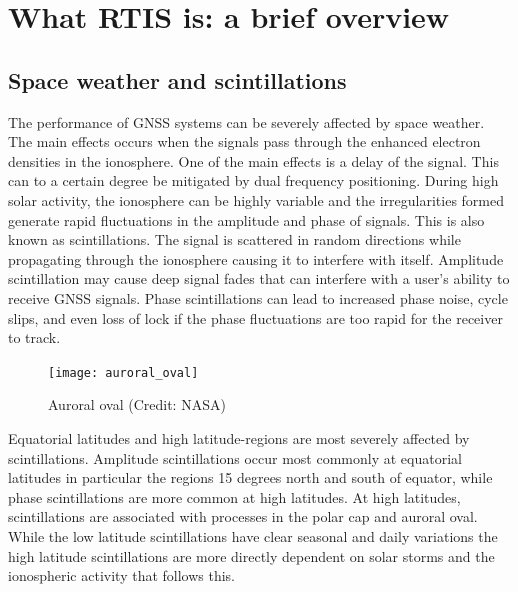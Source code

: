 \documentclass{themeensg}
\begin{document}
  \vspace{1.5cm}
	


\section{What RTIS is: a brief overview}

\subsection{Space weather and scintillations}

The performance of GNSS systems can be severely affected by space weather. The main effects occurs when the signals pass through the enhanced electron densities in the ionosphere. One of the main effects is a delay of the signal. This can to a certain degree be mitigated by dual frequency positioning. During high solar activity, the ionosphere can be highly variable and the irregularities formed generate rapid fluctuations in the amplitude and phase of signals. This is also known as scintillations. The signal is scattered in random directions while propagating through the ionosphere causing it to interfere with itself. Amplitude scintillation may cause deep signal fades that can interfere with a user’s ability to receive GNSS signals. Phase scintillations can lead to increased phase noise, cycle slips, and even loss of lock if the phase fluctuations are too rapid for the receiver to track.\

\begin{figure}[hb]
	\centering
	\texttt{[image: auroral\_oval]}
	\caption{Auroral oval (Credit: NASA)}
\end{figure}

Equatorial latitudes and high latitude-regions are most severely affected by scintillations. Amplitude scintillations occur most commonly at equatorial latitudes in particular the regions 15 degrees north and south of equator, while phase scintillations are more common at high latitudes. At high latitudes, scintillations are associated with processes in the polar cap and auroral oval. While the low latitude scintillations have clear seasonal and daily variations the high latitude scintillations are more directly dependent on solar storms and the ionospheric activity that follows this.\\
\end{document}

